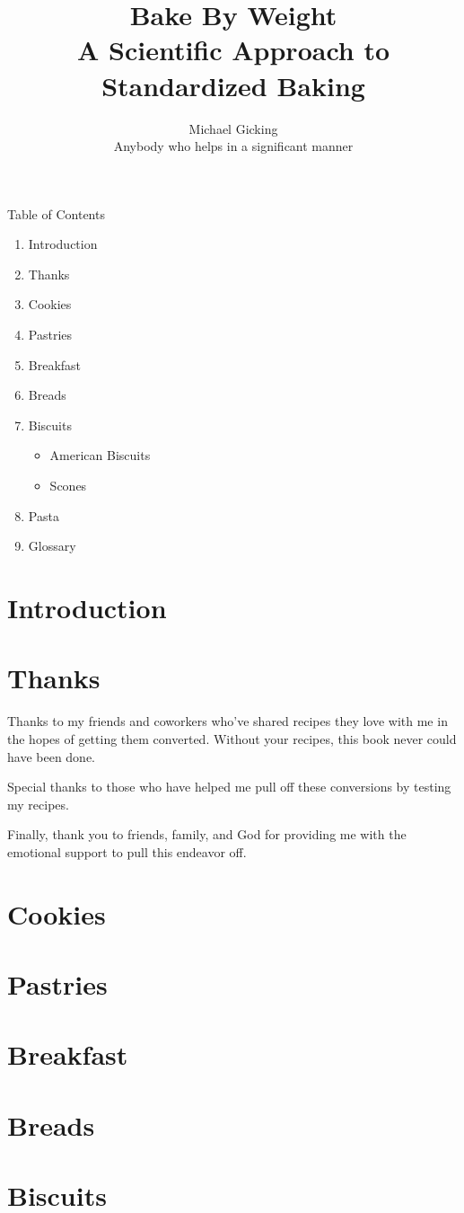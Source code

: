 \documentclass[titlepage]{article}
\title{%
Bake By Weight\\
\large A Scientific Approach to Standardized Baking}
\author{Michael Gicking\\ Anybody who helps in a significant manner}
\begin{document}
\maketitle
Table of Contents
\begin{enumerate}
	\item Introduction
	\item Thanks
	\item Cookies
	\item Pastries
	\item Breakfast
	\item Breads
	\item Biscuits
		\begin{itemize}
			\item American Biscuits
			\item Scones
		\end{itemize}
	\item Pasta
	\item Glossary
\end{enumerate}

\pagebreak
\section*{Introduction}
\section*{Thanks}
Thanks to my friends and coworkers who've shared recipes they love with me in the hopes of getting them converted. Without your recipes, this book never could have been done.
\vspace{\baselineskip}

\noindent Special thanks to those who have helped me pull off these conversions by testing my recipes.
\vspace{\baselineskip}

\noindent Finally, thank you to friends, family, and God for providing me with the emotional support to pull this endeavor off.
\pagebreak
\section{Cookies}
\section{Pastries}
\section{Breakfast}
\section{Breads}
\section{Biscuits}
\end{document}
